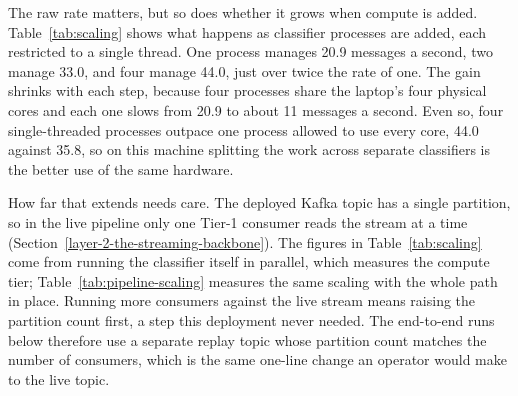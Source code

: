 The raw rate matters, but so does whether it grows when compute is added. Table~\ref{tab:scaling} shows what happens as classifier processes are added, each restricted to a single thread. One process manages 20.9 messages a second, two manage 33.0, and four manage 44.0, just over twice the rate of one. The gain shrinks with each step, because four processes share the laptop's four physical cores and each one slows from 20.9 to about 11 messages a second. Even so, four single-threaded processes outpace one process allowed to use every core, 44.0 against 35.8, so on this machine splitting the work across separate classifiers is the better use of the same hardware.

How far that extends needs care. The deployed Kafka topic has a single partition, so in the live pipeline only one Tier-1 consumer reads the stream at a time (Section~\ref{layer-2-the-streaming-backbone}). The figures in Table~\ref{tab:scaling} come from running the classifier itself in parallel, which measures the compute tier; Table~\ref{tab:pipeline-scaling} measures the same scaling with the whole path in place. Running more consumers against the live stream means raising the partition count first, a step this deployment never needed. The end-to-end runs below therefore use a separate replay topic whose partition count matches the number of consumers, which is the same one-line change an operator would make to the live topic.

